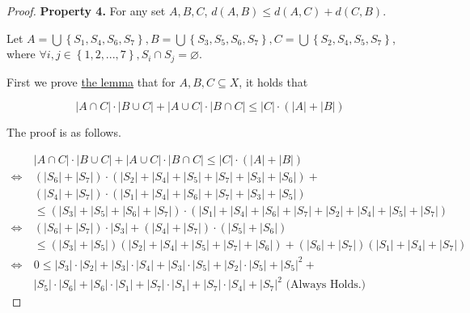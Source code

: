 \documentclass{article}
\newcommand{\set}[1]{\left\{#1\right\}}
\begin{document}
\begin{proof}
    \vspace{1.25em} \hspace{1.3em}
    \textbf{Property 4.} For any set $A,B,C$, $d(A,B)\le d(A,C)+d(C,B)$.

    \vspace{2em} \hspace{13.7em}

    \hspace{1.3em}
    Let $A=\bigcup\set{S_1,S_4,S_6,S_7}, B=\bigcup\set{S_3,S_5,S_6,S_7}, C=\bigcup\set{S_2,S_4,S_5,S_7}$, 
    where $\forall i,j\in\set{1,2,...,7}, S_i\cap S_j=\varnothing$.

    \vspace{0.5em} \hspace{1.3em}
    First we prove \underline{the lemma} that for $A,B,C\subseteq X$, it holds that   

    \vspace{-1.5em}
    $$|A\cap C|\cdot |B\cup C| + |A\cup C| \cdot |B\cap C| \leq |C| \cdot(|A| + |B|) $$

    \vspace{-0.5em} \hspace{1.3em}
    The proof is as follows.

    \vspace{-3em}
    \begin{align*}
        &|A\cap C|\cdot |B\cup C| + |A\cup C| \cdot |B\cap C| \leq |C| \cdot(|A| + |B|) \\
        \Longleftrightarrow\ & \left(|S_6|+|S_7|\right)\cdot\left(|S_2|+|S_4|+|S_5|+|S_7|+|S_3|+|S_6|\right) +\\
        & \left(|S_4|+|S_7|\right)\cdot\left(|S_1|+|S_4|+|S_6|+|S_7|+|S_3|+|S_5|\right) \\
        & \le \left(|S_3|+|S_5|+|S_6|+|S_7|\right)\cdot\left(|S_1|+|S_4|+|S_6|+|S_7|+|S_2|+|S_4|+|S_5|+|S_7|\right) \\
        \Longleftrightarrow\ & \left(|S_6|+|S_7|\right)\cdot|S_3|+\left(|S_4|+|S_7|\right)\cdot\left(|S_5|+|S_6|\right) \\
        & \le \left(|S_3|+|S_5|\right)\left(|S_2|+|S_4|+|S_5|+|S_7|+|S_6|\right)+\left(|S_6|+|S_7|\right)\left(|S_1|+|S_4|+|S_7|\right) \\
        \Longleftrightarrow\ &0\le |S_3|\cdot|S_2|+|S_3|\cdot|S_4|+|S_3|\cdot|S_5|+|S_2|\cdot|S_5|+|S_5|^2+ \\
        &|S_5|\cdot|S_6|+|S_6|\cdot|S_1|+|S_7|\cdot|S_1|+|S_7|\cdot|S_4|+|S_7|^2 \text{ (Always Holds.)}
    \end{align*}


\end{proof}
\end{document}
